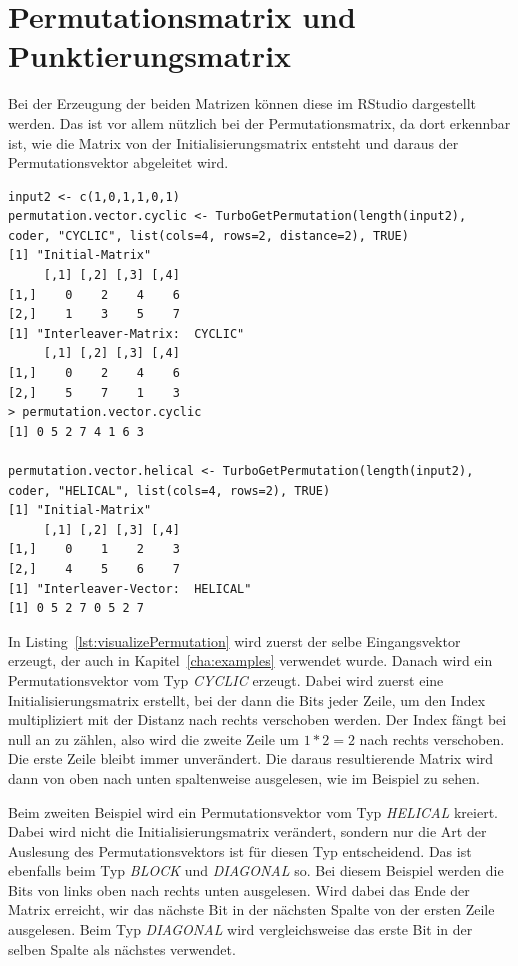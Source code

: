 \section{Permutationsmatrix und Punktierungsmatrix}
\label{sec:visualization_punctuationPermutation}
Bei der Erzeugung der beiden Matrizen können diese im RStudio dargestellt werden. Das ist vor allem nützlich bei der Permutationsmatrix, da dort erkennbar ist, wie die Matrix von der Initialisierungsmatrix entsteht und daraus der Permutationsvektor abgeleitet wird. 

\begin{lstlisting}[caption=Visualisierung der Permutationsmatrix, label={lst:visualizePermutation}, float=th]
input2 <- c(1,0,1,1,0,1)
permutation.vector.cyclic <- TurboGetPermutation(length(input2), coder, "CYCLIC", list(cols=4, rows=2, distance=2), TRUE)
[1] "Initial-Matrix"
     [,1] [,2] [,3] [,4]
[1,]    0    2    4    6
[2,]    1    3    5    7
[1] "Interleaver-Matrix:  CYCLIC"
     [,1] [,2] [,3] [,4]
[1,]    0    2    4    6
[2,]    5    7    1    3
> permutation.vector.cyclic
[1] 0 5 2 7 4 1 6 3

permutation.vector.helical <- TurboGetPermutation(length(input2), coder, "HELICAL", list(cols=4, rows=2), TRUE)
[1] "Initial-Matrix"
     [,1] [,2] [,3] [,4]
[1,]    0    1    2    3
[2,]    4    5    6    7
[1] "Interleaver-Vector:  HELICAL"
[1] 0 5 2 7 0 5 2 7
\end{lstlisting}

In Listing~\ref{lst:visualizePermutation} wird zuerst der selbe Eingangsvektor erzeugt, der auch in Kapitel~\ref{cha:examples} verwendet wurde. Danach wird ein Permutationsvektor vom Typ \emph{CYCLIC} erzeugt. Dabei wird zuerst eine Initialisierungsmatrix erstellt, bei der dann die Bits jeder Zeile, um den Index multipliziert mit der Distanz nach rechts verschoben werden. Der Index fängt bei null an zu zählen, also wird die zweite Zeile um $1*2 = 2$ nach rechts verschoben. Die erste Zeile bleibt immer unverändert. Die daraus resultierende Matrix wird dann von oben nach unten spaltenweise ausgelesen, wie im Beispiel zu sehen.

Beim zweiten Beispiel wird ein Permutationsvektor vom Typ \emph{HELICAL} kreiert. Dabei wird nicht die Initialisierungsmatrix verändert, sondern nur die Art der Auslesung des Permutationsvektors ist für diesen Typ entscheidend. Das ist ebenfalls beim Typ \emph{BLOCK} und \emph{DIAGONAL} so. Bei diesem Beispiel werden die Bits von links oben nach rechts unten ausgelesen. Wird dabei das Ende der Matrix erreicht, wir das nächste Bit in der nächsten Spalte von der ersten Zeile ausgelesen. Beim Typ \emph{DIAGONAL} wird vergleichsweise das erste Bit in der selben Spalte als nächstes verwendet.

